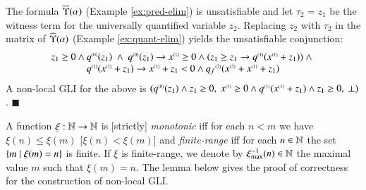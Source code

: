 
\begin{example}\label{ex:gli}
The formula $\overline{\Upsilon}({\alpha})$ (Example \ref{ex:pred-elim}) is
unsatisfiable and let $\tau_2 = z_1$ be the witness term for the
universally quantified variable $z_2$. Replacing $z_2$ with $\tau_2$
in the matrix of $\widehat{\Upsilon}({\alpha})$ (Example \ref{ex:quant-elim})
yields the unsatisfiable conjunction: 
\vspace*{-\baselineskip}
\[\begin{array}{c}
z_1 \geq 0 \wedge {q}^{\scriptscriptstyle{({0})}}(z_1)  ~\wedge~
{q}^{\scriptscriptstyle{({0})}}(z_1) \rightarrow {x}^{\scriptscriptstyle{({1})}} \geq 0 \wedge (z_1 \geq z_1 \rightarrow {q}^{\scriptscriptstyle{({1})}}({x}^{\scriptscriptstyle{({1})}}+z_1)) ~\wedge~ \\
{q}^{\scriptscriptstyle{({1})}}({x}^{\scriptscriptstyle{({1})}}+z_1) \rightarrow {x}^{\scriptscriptstyle{({1})}}+z_1 < 0 \wedge {q_f}^{\scriptscriptstyle{({2})}}({x}^{\scriptscriptstyle{({2})}}+{x}^{\scriptscriptstyle{({1})}}+z_1)
\end{array}\]
A non-local GLI for the above is $({q}^{\scriptscriptstyle{({0})}}(z_1) \wedge
z_1\geq 0,~ {x}^{\scriptscriptstyle{({1})}} \geq 0 \wedge {q}^{\scriptscriptstyle{({1})}}({x}^{\scriptscriptstyle{({1})}}+z_1)
\wedge z_1\geq0,~\bot)$. \hfill$\blacksquare$
\end{example}

A function $\xi : {\bf \mathbb{N}} \rightarrow {\bf \mathbb{N}}$ is [strictly]
\emph{monotonic} iff for each $n < m$ we have $\xi(n) \leq \xi(m)$
     [$\xi(n) < \xi(m)$] and \emph{finite-range} iff for each $n \in
     {\bf \mathbb{N}}$ the set $\{ m \mid \xi(m)=n \}$ is finite. If $\xi$ is
     finite-range, we denote by $\xi_{\max}^{-1}(n) \in {\bf \mathbb{N}}$ the
     maximal value $m$ such that $\xi(m)=n$. The lemma below gives the
     proof of correctness for the construction of non-local GLI.

